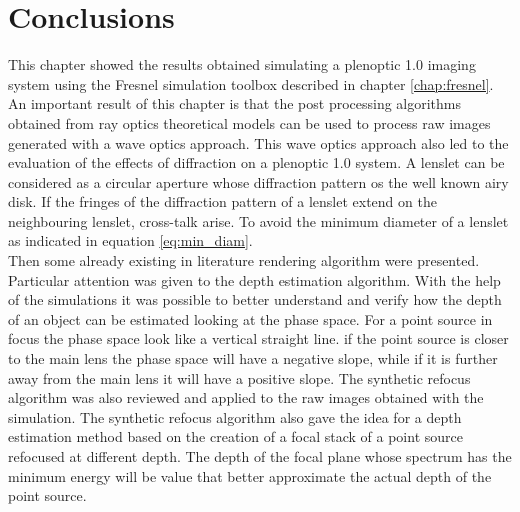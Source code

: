 \section{Conclusions}
This chapter showed the results obtained simulating a plenoptic 1.0 imaging system using the Fresnel simulation toolbox described in chapter \ref{chap:fresnel}. An important result of this chapter is that the post processing algorithms obtained from ray optics theoretical models can be used to process raw images generated with a wave optics approach. This wave optics approach also led to the evaluation of the effects of diffraction on a plenoptic 1.0 system. A lenslet can be considered as a circular aperture whose diffraction pattern os the well known airy disk. If the fringes of the diffraction pattern of a lenslet extend on the neighbouring lenslet, cross-talk arise. To avoid the minimum diameter of a lenslet as indicated in equation \ref{eq:min_diam}.\\
Then some already existing in literature rendering algorithm were presented. Particular attention was given to the depth estimation algorithm. With the help of the simulations it was possible to better understand and verify how the depth of an object can be estimated looking at the phase space. For a point source in focus the phase space look like a vertical straight line. if the point source is closer to the main lens the phase space will have a negative slope, while if it is further away from the main lens it will have a positive slope. The synthetic refocus algorithm was also reviewed and applied to the raw images obtained with the simulation. The synthetic refocus algorithm also gave the idea for a depth estimation method based on the creation of a focal stack of a point source refocused at different depth. The depth of the focal plane whose spectrum has the minimum energy will be value that better approximate the actual depth of the point source.

